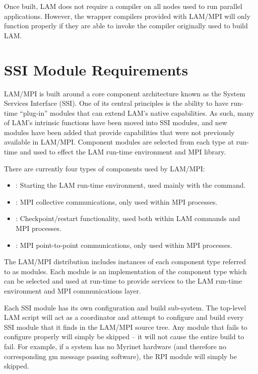 Once built, LAM does not require a compiler on all nodes used to run
parallel applications.  However, the wrapper compilers provided with
LAM/MPI will only function properly if they are able to invoke the
compiler originally used to build LAM.


\section{SSI Module Requirements}
\label{sec:requirements:ssi}

LAM/MPI is built around a core component architecture known as the
System Services Interface (SSI).  One of its central principles is the
ability to have run-time ``plug-in'' modules that can extend LAM's
native capabilities.  As such, many of LAM's intrinsic functions have
been moved into SSI modules, and new modules have been added that
provide capabilities that were not previously available in LAM/MPI.
Component modules are selected from each type at run-time and used to
effect the LAM run-time environment and MPI library.

There are currently four types of components used by LAM/MPI:

\begin{itemize}
\item {}: Starting the LAM run-time environment, used mainly
  with the  command.

\item {}: MPI collective communications, only used within MPI
  processes.

\item {}: Checkpoint/restart functionality, used both within
  LAM commands and MPI processes.

\item {}: MPI point-to-point communications, only used within
  MPI processes.  
\end{itemize}

The LAM/MPI distribution includes instances of each component type
referred to as modules.  Each module is an implementation of the
component type which can be selected and used at run-time to provide
services to the LAM run-time environment and MPI communications layer.

Each SSI module has its own configuration and build sub-system.  The
top-level LAM  script will act as a coordinator and
attempt to configure and build every SSI module that it finds in the
LAM/MPI source tree.  Any module that fails to configure properly will
simply be skipped -- it will not cause the entire build to fail.  For
example, if a system has no Myrinet hardware (and therefore no
corresponding gm message passing software), the  RPI module
will simply be skipped.


